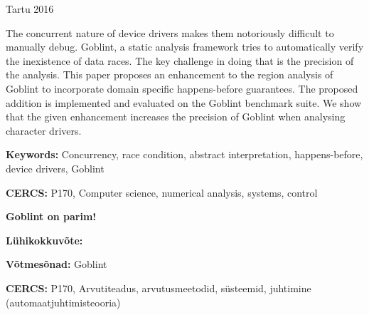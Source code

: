 \documentclass{style/master-thesis}
\begin{document}
\vfill
\centerline{Tartu 2016}



\pagebreak

\noindent\textbf{\large \articleName}
\vspace*{3ex}
{ The concurrent nature of device drivers makes them notoriously difficult to manually debug.
Goblint, a static analysis framework tries to automatically verify the inexistence of data races. The key challenge in doing that is the precision of the analysis.
This paper proposes an enhancement to the region analysis of Goblint to incorporate domain specific happens-before guarantees. 
The proposed addition is implemented and evaluated on the Goblint benchmark suite.
We show that the given enhancement increases the precision of Goblint when analysing character drivers.
}

\vspace*{3ex}
\begin{flushleft}
  \textbf{Keywords:} Concurrency, race condition, abstract interpretation, happens-before, device drivers, Goblint
\end{flushleft}
\vspace*{3ex}

\noindent\textbf{CERCS:} P170, Computer science, numerical analysis, systems, control

\vspace*{6ex}
\noindent\textbf{Goblint on parim!}
\vspace*{3ex}


\noindent\textbf{Lühikokkuvõte:} 
\vspace*{3ex}

\begin{flushleft}
  \textbf{Võtmesõnad:} Goblint
\end{flushleft}
\vspace*{3ex}

\noindent\textbf{CERCS:} P170, Arvutiteadus, arvutusmeetodid, süsteemid, juhtimine (automaatjuhtimisteooria)

\newpage

\end{document}

